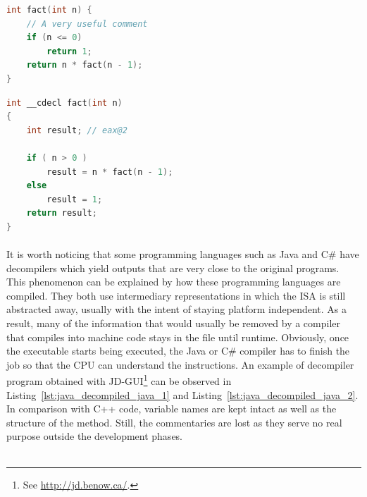 \noindent\begin{minipage}{.45\textwidth}
	\begin{lstlisting}[caption={Hand written C++ program.}, label={lst:cpp_decompiled_cpp_1}, frame=tlrb, language=C++]
int fact(int n) {
	// A very useful comment
	if (n <= 0)
		return 1;
	return n * fact(n - 1);
}
	\end{lstlisting}
\end{minipage}\hfill
\begin{minipage}{.45\textwidth}
	\begin{lstlisting}[caption={Output of the Hex-Rays Decompiler applied to the compiled version of the code found in Listing~\ref{lst:cpp_decompiled_cpp_1}.}, label={lst:cpp_decompiled_cpp_2}, frame=tlrb, language=C++]
int __cdecl fact(int n)
{
	int result; // eax@2
	
	if ( n > 0 )
		result = n * fact(n - 1);
	else
		result = 1;
	return result;
}
	\end{lstlisting}
\end{minipage}           

\paragraph{}
It is worth noticing that some programming languages such as Java and C\# have decompilers which yield outputs that are very close to the original programs. This phenomenon can be explained by how these programming languages are compiled. They both use intermediary representations in which the ISA is still abstracted away, usually with the intent of staying platform independent. As a result, many of the information that would usually be removed by a compiler that compiles into machine code stays in the file until runtime. Obviously, once the executable starts being executed, the Java or C\# compiler has to finish the job so that the CPU can understand the instructions. An example of decompiler program obtained with JD-GUI\footnote{See \url{http://jd.benow.ca/}.} can be observed in Listing~\ref{lst:java_decompiled_java_1} and Listing~\ref{lst:java_decompiled_java_2}. In comparison with C++ code,  variable names are kept intact as well as the structure of the method. Still, the commentaries are lost as they serve no real purpose outside the development phases. \\ \\

